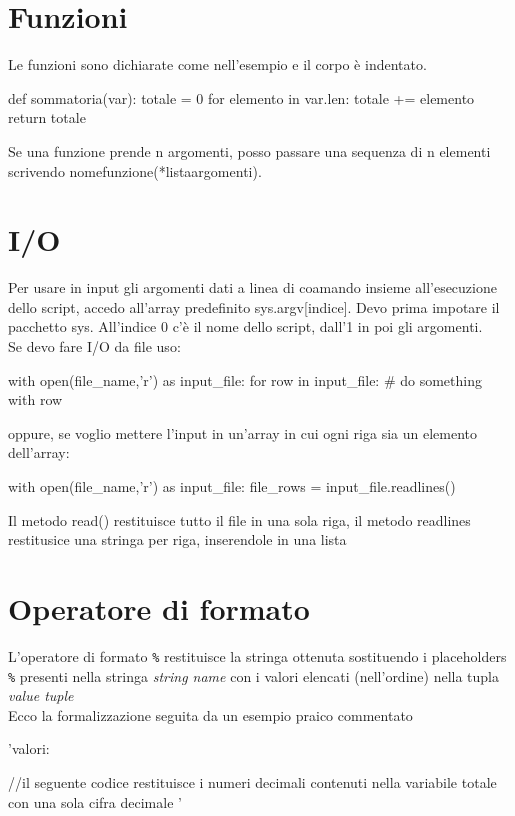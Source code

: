 \chapter{Funzioni}
Le funzioni sono dichiarate come nell'esempio e il corpo è indentato.

\begin{py}
def sommatoria(var):
	totale = 0
	for elemento in var.len:
		totale += elemento
	return totale
\end{py}

Se una funzione prende n argomenti, posso passare una sequenza di n elementi scrivendo nomefunzione(*listaargomenti).

\chapter{I/O}
Per usare in input gli argomenti dati a linea di coamando insieme all'esecuzione dello script, accedo all'array predefinito sys.argv[indice]. Devo prima impotare il pacchetto sys. All'indice 0 c'è il nome dello script, dall'1 in poi gli argomenti.\\
Se devo fare I/O da file uso:

\begin{py}
with open(file_name,'r') as input_file:
	for row in input_file:
		# do something with row
\end{py}

oppure, se voglio mettere l'input in un'array in cui ogni riga sia un elemento dell'array:

\begin{py}
with open(file_name,'r') as input_file:
	file_rows = input_file.readlines()
\end{py}

Il metodo read() restituisce tutto il file in una sola riga, il metodo readlines restitusice una stringa per riga, inserendole in una lista

\chapter{Operatore di formato}
L'operatore di formato \verb|%| restituisce la stringa ottenuta sostituendo i placeholders \verb|%| presenti nella stringa \textit{string name} con i valori elencati (nell'ordine) nella tupla \textit{value tuple}\\
Ecco la formalizzazione seguita da un esempio praico commentato
\begin{py}
'valori:  %

//il seguente codice restituisce i numeri decimali contenuti nella variabile totale con una sola cifra decimale
'%
\end{py}

